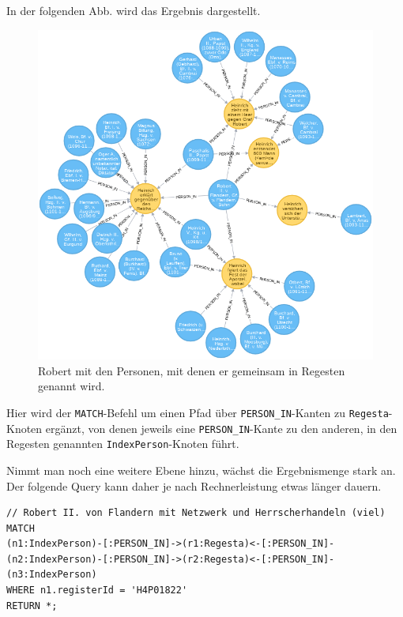 \documentclass[ngerman,]{scrreprt}
\begin{document}
In der folgenden Abb. wird das Ergebnis dargestellt.

\begin{figure}
\centering
\includegraphics{Bilder/RI2Graph/RobertVonFlandernMitRegesten.png}
\caption{Robert mit den Personen, mit denen er gemeinsam in Regesten genannt wird.}
\end{figure}

Hier wird der \texttt{MATCH}-Befehl um einen Pfad über \texttt{PERSON\_IN}-Kanten zu \texttt{Regesta}-Knoten ergänzt, von denen jeweils eine \texttt{PERSON\_IN}-Kante zu den anderen, in den Regesten genannten \texttt{IndexPerson}-Knoten führt.

Nimmt man noch eine weitere Ebene hinzu, wächst die Ergebnismenge stark an. Der folgende Query kann daher je nach Rechnerleistung etwas länger dauern.

\begin{verbatim}
// Robert II. von Flandern mit Netzwerk und Herrscherhandeln (viel)
MATCH
(n1:IndexPerson)-[:PERSON_IN]->(r1:Regesta)<-[:PERSON_IN]-
(n2:IndexPerson)-[:PERSON_IN]->(r2:Regesta)<-[:PERSON_IN]-
(n3:IndexPerson)
WHERE n1.registerId = 'H4P01822'
RETURN *;
\end{verbatim}
\end{document}
